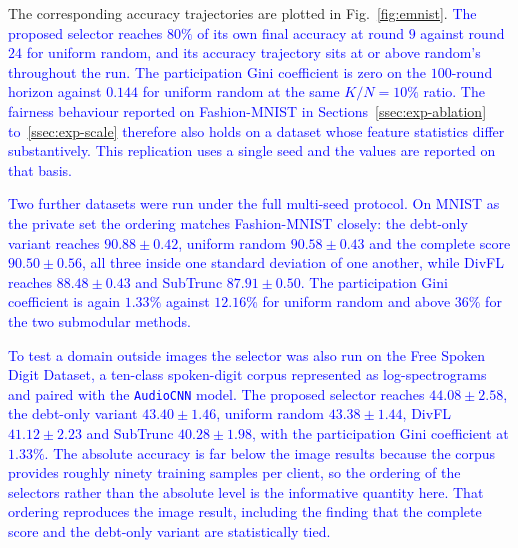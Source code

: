\documentclass[journal]{IEEEtran}
\newcommand{\new}[1]{#1}
\newcommand{\rev}[1]{\textcolor{blue}{#1}}
\begin{document}
\new{The corresponding accuracy trajectories are plotted in Fig.~\ref{fig:emnist}. \rev{The proposed selector reaches $80\%$ of its own final accuracy at round $9$ against round $24$ for uniform random, and its accuracy trajectory sits at or above random's throughout the run. The participation Gini coefficient is zero on the $100$-round horizon against $0.144$ for uniform random at the same $K/N = 10\%$ ratio. The fairness behaviour reported on Fashion-MNIST in Sections~\ref{ssec:exp-ablation} to~\ref{ssec:exp-scale} therefore also holds on a dataset whose feature statistics differ substantively. This replication uses a single seed and the values are reported on that basis.}}

\rev{Two further datasets were run under the full multi-seed protocol. On MNIST as the private set the ordering matches Fashion-MNIST closely: the debt-only variant reaches $90.88 \pm 0.42$, uniform random $90.58 \pm 0.43$ and the complete score $90.50 \pm 0.56$, all three inside one standard deviation of one another, while DivFL reaches $88.48 \pm 0.43$ and SubTrunc $87.91 \pm 0.50$. The participation Gini coefficient is again $1.33\%$ against $12.16\%$ for uniform random and above $36\%$ for the two submodular methods.

To test a domain outside images the selector was also run on the Free Spoken Digit Dataset, a ten-class spoken-digit corpus represented as log-spectrograms and paired with the \texttt{AudioCNN} model. The proposed selector reaches $44.08 \pm 2.58$, the debt-only variant $43.40 \pm 1.46$, uniform random $43.38 \pm 1.44$, DivFL $41.12 \pm 2.23$ and SubTrunc $40.28 \pm 1.98$, with the participation Gini coefficient at $1.33\%$. The absolute accuracy is far below the image results because the corpus provides roughly ninety training samples per client, so the ordering of the selectors rather than the absolute level is the informative quantity here. That ordering reproduces the image result, including the finding that the complete score and the debt-only variant are statistically tied.}
\end{document}
